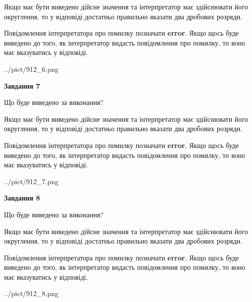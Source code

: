 \documentclass[12pt, ukrainian]{article}
\begin{document}
{\begin {Large}
Якщо має бути виведено дійсне значення та інтерпретатор має здійснювати його округлення, 
то у відповіді достатньо правильно вказати два дробових розряди.

Повідомлення інтерпретатора про помилку позначати \textbf{error}.
Якщо щось буде виведено до того, як інтерпретатор видасть повідомлення про помилку, 
то воно має вказуватись у відповіді. \par

\begin{center}
	{../pict/912_6.png}
\end{center}
\newpage

{\begin {center}\textbf{Завдання 7}\end {center}}\par
Що буде виведено за виконання? \par

Якщо має бути виведено дійсне значення та інтерпретатор має здійснювати його округлення, 
то у відповіді достатньо правильно вказати два дробових розряди.

Повідомлення інтерпретатора про помилку позначати \textbf{error}.
Якщо щось буде виведено до того, як інтерпретатор видасть повідомлення про помилку, 
то воно має вказуватись у відповіді. \par

\begin{center}
	{../pict/912_7.png}
\end{center}
\newpage

{\begin {center}\textbf{Завдання 8}\end {center}}\par
Що буде виведено за виконання? \par

Якщо має бути виведено дійсне значення та інтерпретатор має здійснювати його округлення, 
то у відповіді достатньо правильно вказати два дробових розряди.

Повідомлення інтерпретатора про помилку позначати \textbf{error}.
Якщо щось буде виведено до того, як інтерпретатор видасть повідомлення про помилку, 
то воно має вказуватись у відповіді. \par

\begin{center}
	{../pict/912_8.png}
\end{center}
\newpage


\end{Large}}
\end{document}
